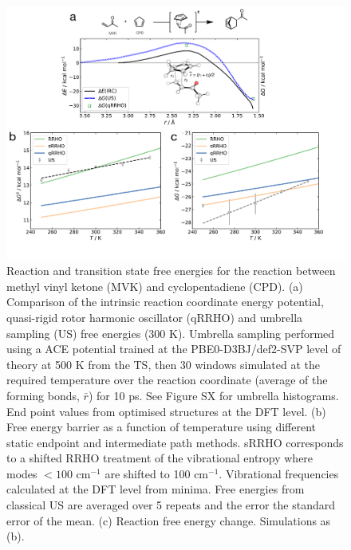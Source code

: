 \documentclass[twoside,twocolumn,9pt]{article}
\begin{document}
\begin{figure}[tb]
	\centering
	\includegraphics[width=15cm]{figX3}
	\caption{Reaction and transition state free energies for the reaction between methyl vinyl ketone (MVK) and cyclopentadiene (CPD). (a) Comparison of the intrinsic reaction coordinate energy potential, quasi-rigid rotor harmonic oscillator (qRRHO) and umbrella sampling (US) free energies (300 K). Umbrella sampling performed using a ACE potential trained at the PBE0-D3BJ/def2-SVP level of theory at 500 K from the TS, then 30 windows simulated at the required temperature over the reaction coordinate (average of the forming bonds, $\bar{r}$) for 10 ps. See Figure SX for umbrella histograms. End point values from optimised structures at the DFT level. (b) Free energy barrier as a function of temperature using different static endpoint and intermediate path methods. sRRHO corresponds to a shifted RRHO treatment of the vibrational entropy where modes $<100$ cm$^{-1}$ are shifted to 100 cm$^{-1}$. Vibrational frequencies calculated at the DFT level from minima. Free energies from classical US are averaged over 5 repeats and the error the standard error of the mean. (c) Reaction free energy change. Simulations as (b).}
	\label{fig::X3}
\end{figure}
\end{document}
